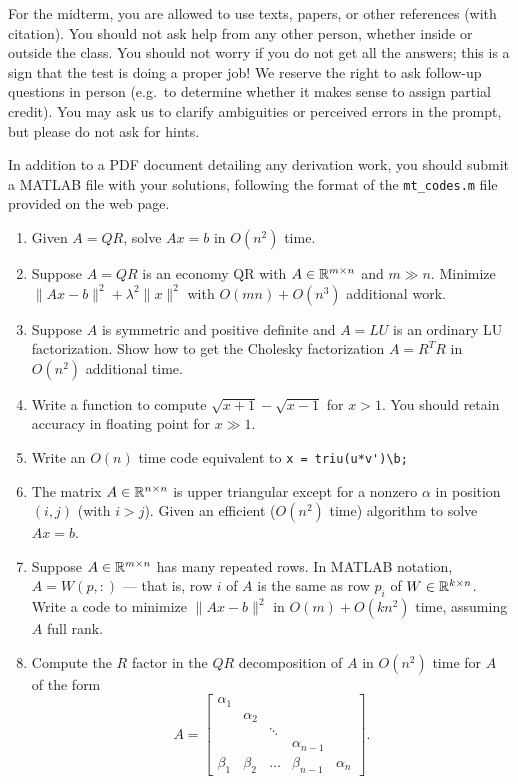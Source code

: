 \documentclass[12pt, leqno]{article}
\begin{document}

For the midterm, you are allowed to use texts, papers, or other
references (with citation).  You should not ask help from any other
person, whether inside or outside the class.  You should not worry if
you do not get all the answers; this is a sign that the test is doing
a proper job!  We reserve the right to ask follow-up questions in
person (e.g.~to determine whether it makes sense to assign partial
credit).  You may ask us to clarify ambiguities or perceived errors in
the prompt, but please do not ask for hints.

In addition to a PDF document detailing any derivation work,
you should submit a MATLAB file with your solutions, following
the format of the \verb|mt_codes.m| file provided on the web page.

\begin{enumerate}
  
\item Given $A = QR$, solve $Ax = b$ in $O(n^2)$ time.
    
\item Suppose $A = QR$ is an economy QR with $A \in \mathbb{R}^{m \times n}$
  and $m \gg n$.
  Minimize $\|Ax-b\|^2 + \lambda^2 \|x\|^2$ with
  $O(mn) + O(n^3)$ additional work.
    
\item Suppose $A$ is symmetric and positive definite and $A = LU$ is
  an ordinary LU factorization.  Show how to get the Cholesky
  factorization $A = R^T R$ in $O(n^2)$ additional time.

\item
  Write a function to compute $\sqrt{x+1}-\sqrt{x-1}$ for $x > 1$.
  You should retain accuracy in floating point for $x \gg 1$.

\item
  Write an $O(n)$ time code equivalent to \verb|x = triu(u*v')\b;|

\item
  The matrix $A \in \mathbb{R}^{n \times n}$ is upper triangular except for
  a nonzero $\alpha$ in position $(i,j)$ (with $i > j$).  Given an efficient
  ($O(n^2)$ time) algorithm to solve $Ax = b$.

\item
  Suppose $A \in \mathbb{R}^{m \times n}$ has many repeated rows.  In MATLAB
  notation, $A = W(p,:)$ --- that is, row $i$ of $A$ is the same as
  row $p_i$ of $W \in \mathbb{R}^{k \times n}$.  Write a code to minimize
  $\|Ax-b\|^2$ in $O(m) + O(k n^2)$ time, assuming $A$ full rank.
  
\item
  Compute the $R$ factor in the $QR$
  decomposition of $A$ in $O(n^2)$ time for $A$ of the form
  \[
  A = \begin{bmatrix}
    \alpha_1 \\
    & \alpha_2  \\
    & & \ddots \\
    & & & \alpha_{n-1} &  \\
    \beta_1 & \beta_2 & \ldots & \beta_{n-1} & \alpha_n
  \end{bmatrix}.
  \]

\end{enumerate}
\end{document}
